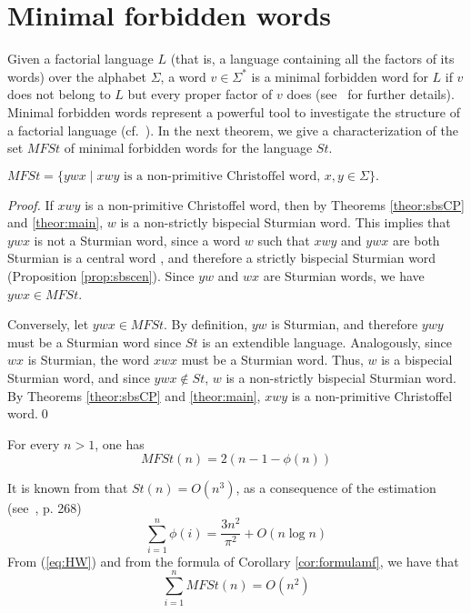 \documentclass{llncs}
\newcommand{\St}{\textit{St}}
\newcommand{\MF}{\textit{MFSt}}
\begin{document}
\section{Minimal forbidden words}\label{sec:MF}


Given a factorial language $L$ (that is, a language containing all the factors of its words) over the alphabet $\Sigma$, a word $v\in \Sigma^{*}$ is a minimal forbidden word for $L$ if $v$ does not belong to $L$ but every proper factor of $v$ does (see~\cite{CrMiRe98} for further details). Minimal forbidden words represent a powerful tool to investigate the structure of a factorial language (cf.~\cite{BeMiRe96}). In the next theorem, we give a characterization of the set $\MF$ of minimal forbidden words for the language $\St$. 


\begin{theorem}\label{theor:mf}
 $\MF=\{ywx \mid xwy \mbox{ is a non-primitive Christoffel word, $x,y\in \Sigma$}\}.$
\end{theorem}

\begin{proof}
If $xwy$ is a non-primitive Christoffel word, then by Theorems \ref{theor:sbsCP} and  \ref{theor:main}, $w$ is a non-strictly bispecial Sturmian word. This implies that $ywx$ is not a Sturmian word, since a word $w$ such that $xwy$ and $ywx$ are both Sturmian is a central word \cite{DelMi94}, and therefore a strictly bispecial Sturmian word (Proposition \ref{prop:sbscen}). Since $yw$ and $wx$ are Sturmian words, we have $ywx\in \MF$.

Conversely, let $ywx\in \MF$. By definition, $yw$ is Sturmian, and therefore $ywy$ must be a  Sturmian word since $\St$ is an extendible language. Analogously, since $wx$ is Sturmian, the word $xwx$ must be a Sturmian word. Thus, $w$ is a bispecial Sturmian word, and since $ywx\notin \St$, $w$ is a  non-strictly bispecial Sturmian word. By Theorems \ref{theor:sbsCP} and \ref{theor:main}, $xwy$ is a non-primitive Christoffel word.\qed
\end{proof}

\begin{corollary}\label{cor:formulamf}
 For every $n>1$, one has \[\MF(n)=2(n-1-\phi(n))\]
\end{corollary}

It is known from \cite{Mig91} that $\St(n)=O(n^{3})$, as a consequence of the estimation (see~\cite{HaWr}, p. 268)
\begin{equation}\label{eq:HW}
 \sum_{i=1}^{n}\phi(i)=\frac{3n^{2}}{\pi^{2}}+O(n\log n)
\end{equation}
From (\ref{eq:HW}) and from the formula of Corollary \ref{cor:formulamf}, we have that $$\sum_{i=1}^{n}\MF(n)=O(n^{2})$$




\end{document}
